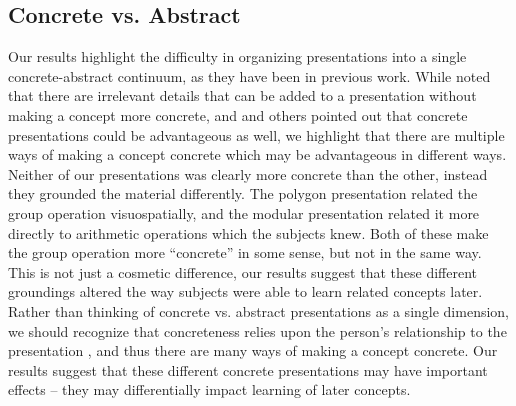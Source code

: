 \documentclass[man,10pt]{apa6}
\begin{document}
\subsection{Concrete vs. Abstract}
Our results highlight the difficulty in organizing presentations into a single concrete-abstract continuum, as they have been in previous work. While  noted that there are irrelevant details that can be added to a presentation without making a concept more concrete, and  and others pointed out that concrete presentations could be advantageous as well, we highlight that there are multiple ways of making a concept concrete which may be advantageous in different ways. Neither of our presentations was clearly more concrete than the other, instead they grounded the material differently. The polygon presentation related the group operation visuospatially, and the modular presentation related it more directly to arithmetic operations which the subjects knew. Both of these make the group operation more ``concrete'' in some sense, but not in the same way. This is not just a cosmetic difference, our results suggest that these different groundings altered the way subjects were able to learn related concepts later. Rather than thinking of concrete vs. abstract presentations as a single dimension, we should recognize that concreteness relies upon the person's relationship to the presentation \cite{Wilensky1991}, and thus there are many ways of making a concept concrete. Our results suggest that these different concrete presentations may have important effects -- they may differentially impact learning of later concepts. \par
\end{document}
